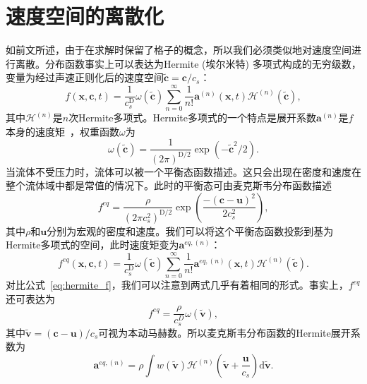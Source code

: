 \section{速度空间的离散化}
如前文所述，由于在求解时保留了格子的概念，所以我们必须类似地对速度空间进行离散。分布函数事实上可以表达为Hermite (埃尔米特) 多项式构成的无穷级数，变量为经过声速正则化后的速度空间$\tilde{\mathbf{c}}=\mathbf{c}/c_s$：
\begin{equation}
    f(\boldsymbol{x}, \mathbf{c}, t)=\frac{1}{c_s^{\mathrm{D}}} \omega(\tilde{\mathbf{c}}) \sum_{n=0}^{\infty} \frac{1}{n !} \boldsymbol{a}^{(n)}(\boldsymbol{x}, t) \mathscr{H}^{(n)}(\tilde{\mathbf{c}}),
    \label{eq:hermite_f}
\end{equation}
其中$\mathscr{H}^{(n)}$是$n$次Hermite多项式。Hermite多项式的一个特点是展开系数$\boldsymbol{a}^{(n)}$是$f$本身的速度矩~\citep{shan2006kinetic}，权重函数$\omega$为
\begin{equation}
    \omega(\tilde{\mathbf{c}})=\frac{1}{(2 \pi)^{\mathrm{D} / 2}} \exp \left(-\tilde{\mathbf{c}}^2 / 2\right).
\end{equation}
当流体不受压力时，流体可以被一个平衡态函数描述。这只会出现在密度和速度在整个流体域中都是常值的情况下。此时的平衡态可由麦克斯韦分布函数描述
\begin{equation}
    f^{eq}=\frac{\rho}{\left(2 \pi c_s^2\right)^{\mathrm{D} / 2}} \exp \left(\frac{-(\mathbf{c}-\boldsymbol{u})^2}{2 c_s^2}\right),
    \label{eq:maxwell_eq}
\end{equation}
其中$\rho$和$\boldsymbol{u}$分别为宏观的密度和速度。我们可以将这个平衡态函数投影到基为Hermite多项式的空间，此时速度矩变为$\boldsymbol{a}^{eq,(n)}$：
\begin{equation}
    f^{eq}(\boldsymbol{x}, \mathbf{c}, t)=\frac{1}{c_s^{\mathrm{D}}} \omega(\tilde{\mathbf{c}}) \sum_{n=0}^{\infty} \frac{1}{n !} \boldsymbol{a}^{eq,(n)}(\boldsymbol{x}, t) \mathscr{H}^{(n)}(\tilde{\mathbf{c}}).
    \label{eq:maxwell_eq_hermite}
\end{equation}
对比公式~\ref{eq:hermite_f}，我们可以注意到两式几乎有着相同的形式。事实上，$f^{eq}$还可表达为
\begin{equation}
    f^{eq}=\frac{\rho}{c_s^D}\omega(\tilde{\boldsymbol{v}}),
\end{equation}
其中$\tilde{\boldsymbol{v}}=(\mathbf{c}-\mathbf{u})/c_s$可视为本动马赫数。所以麦克斯韦分布函数的Hermite展开系数为
\begin{equation}
    \boldsymbol{a}^{eq,(n)}=\rho \int w(\tilde{\boldsymbol{v}}) \mathscr{H}^{(n)}\left(\tilde{\boldsymbol{v}}+\frac{\boldsymbol{u}}{c_s}\right) \mathrm{d} \tilde{\boldsymbol{v}}.
    \label{eq:hermite_coefficients}
\end{equation}

